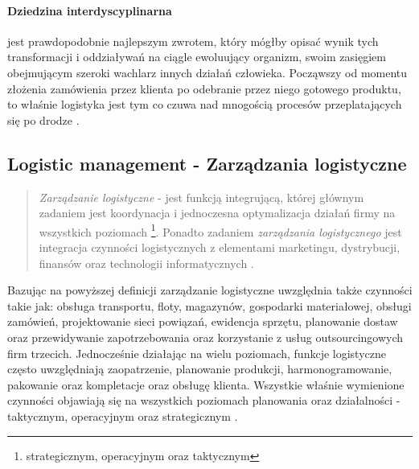 		\paragraph{Dziedzina interdyscyplinarna} jest prawdopodobnie najlepszym zwrotem, 
		który mógłby opisać wynik tych transformacji i oddziaływań na ciągle ewoluujący organizm, swoim
		zasięgiem obejmującym szeroki wachlarz innych działań człowieka. Począwszy od momentu złożenia
		zamówienia przez klienta po odebranie przez niego gotowego produktu, to właśnie logistyka jest
		tym co czuwa nad mnogością procesów przeplatających się po drodze \cite{logistyka_jako_dziedzina_wiedzy_cz2}.
	\subsection{Logistic management - Zarządzania logistyczne}
		\begin{quote}
			\emph{Zarządzanie logistyczne} - jest funkcją integrującą, której głównym zadaniem jest
			koordynacja i jednoczesna optymalizacja działań firmy na wszystkich poziomach
			\footnote{strategicznym, operacyjnym oraz taktycznym}. Ponadto zadaniem \emph{zarządzania logistycznego} jest
			integracja czynności logistycznych z elementami marketingu, dystrybucji, finansów oraz technologii
			informatycznych	\cite{csmp_logistic_management}. 
		\end{quote}
		Bazując na powyższej definicji zarządzanie logistyczne uwzględnia także czynności takie jak:
		obsługa transportu, floty, magazynów, gospodarki materiałowej, obsługi zamówień, 
		projektowanie sieci powiązań, ewidencja sprzętu,
		planowanie dostaw oraz przewidywanie zapotrzebowania oraz korzystanie z 
		usług outsourcingowych firm trzecich. Jednocześnie działając na wielu poziomach, 
		funkcje logistyczne często uwzględniają zaopatrzenie, planowanie produkcji, harmonogramowanie, 
		pakowanie oraz kompletacje oraz obsługę klienta. Wszystkie właśnie wymienione czynności
		objawiają się na wszystkich poziomach planowania oraz działalności - taktycznym, operacyjnym oraz
		strategicznym \cite{csmp_logistic_management}.
